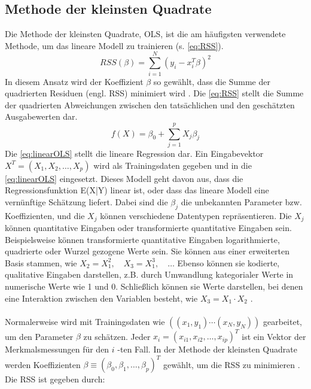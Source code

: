 \subsection{Methode der kleinsten Quadrate}
\label{methodederkleinstenquadrate}
Die Methode der kleinsten Quadrate, \ac{OLS}, ist die am häufigsten verwendete Methode, um das lineare Modell zu trainieren (s. \autoref{eq:RSS}). 
\begin{equation}
RSS(\beta) = \sum_{i=1}^{N} (y_i - x_i^T \beta)^2 
\label{eq:RSS}
\end{equation}
In diesem Ansatz wird der Koeffizient $\beta$ so gewählt, dass die Summe der quadrierten Residuen (engl. \ac{RSS}) minimiert wird \cite{hastie2009elements}. Die \autoref{eq:RSS} stellt die Summe der quadrierten Abweichungen zwischen den tatsächlichen und den geschätzten Ausgabewerten dar. 
\begin{equation}
f(X) = \beta_0 + \sum_{j=1}^{p} X_j \beta_j 
\label{eq:linearOLS}
\end{equation}
Die \autoref{eq:linearOLS} stellt die lineare Regression dar. Ein Eingabevektor \( X^T = (X_1, X_2, \ldots, X_p) \) wird als Trainingsdaten gegeben und in die \autoref{eq:linearOLS} eingesetzt. Dieses Modell geht davon aus, dass die Regressionsfunktion E(X|Y) linear ist, oder dass das lineare Modell eine vernünftige Schätzung liefert. Dabei sind die $\beta_j$ die unbekannten Parameter bzw. Koeffizienten, und die \( X_j \) können verschiedene Datentypen repräsentieren. Die \( X_j \) können quantitative Eingaben oder transformierte quantitative Eingaben sein. Beispielsweise können transformierte quantitative Eingaben logarithmierte, quadrierte oder Wurzel gezogene Werte sein. Sie können aus einer erweiterten Basis stammen, wie \( X_2 = X_1^2, \quad X_3 = X_1^3,\quad \ldots \) Ebenso können sie kodierte, qualitative Eingaben darstellen, z.B. durch Umwandlung kategorialer Werte in numerische Werte wie 1 und 0. Schließlich können sie Werte darstellen, bei denen eine Interaktion zwischen den Variablen besteht, wie \( X_3 = X_1 \cdot X_2 \) \cite{hastie2009elements}.\\\\
Normalerweise wird mit Trainingsdaten wie \( ( (x_1, y_1) \cdots (x_N, y_N) ) \) gearbeitet, um den Parameter $\beta$ zu schätzen. Jeder \( x_i = (x_{i1}, x_{i2}, \ldots, x_{ip})^T \) ist ein Vektor der Merkmalsmessungen für den \(i\) -ten Fall. In der Methode der kleinsten Quadrate werden Koeffizienten \( \beta \equiv (\beta_0, \beta_1, \ldots, \beta_p)^T \) gewählt, um die \ac{RSS} zu minimieren \cite{hastie2009elements}. Die \ac{RSS} ist gegeben durch:
